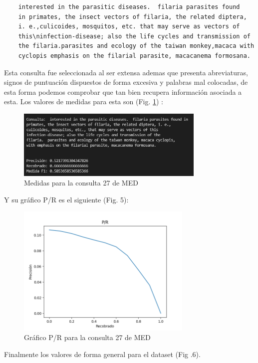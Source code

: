\documentclass[runningheads,a4paper]{llncs}
\begin{document}
\begin{verbatim}
	interested in the parasitic diseases.  filaria parasites found 
	in primates, the insect vectors of filaria, the related diptera, 
	i. e.,culicoides, mosquitos, etc. that may serve as vectors of 
	this\ninfection-disease; also the life cycles and transmission of 
	the filaria.parasites and ecology of the taiwan monkey,macaca with
	cyclopis emphasis on the filarial parasite, macacanema formosana.
\end{verbatim}

Esta consulta fue seleccionada al ser extensa ademas que presenta abreviaturas, signos de puntuación dispuestos de forma excesiva y palabras mal colocadas, de esta forma podemos comprobar que tan bien recupera información asociada a esta. Los valores de medidas para esta son (Fig. \ref{fig:med1}) :

\begin{figure}
	\centering
	\includegraphics[height=3.3cm]{imgs/eval_query27_med.png}
	\caption{Medidas para la consulta 27 de MED}
	\label{fig:med1}
\end{figure}

Y su gráfico P/R es el siguiente (Fig. 5):

\begin{figure}
	\centering
	\includegraphics[height=6.3cm]{imgs/pr_query27_med.png}
	\caption{Gráfico P/R para la consulta 27 de MED}
	\label{fig:med1pr}
\end{figure}

Finalmente los valores de forma general para el dataset (Fig .6). 
\end{document}
